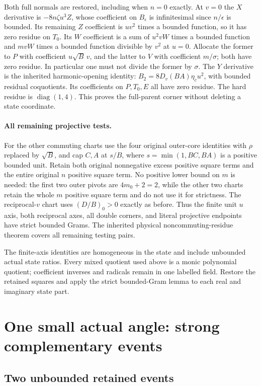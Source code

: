 Both full normals are restored, including when $n=0$ exactly.
At $v=0$ the $X$ derivative is $-8n\zeta u^3Z$, whose coefficient
on $B_\epsilon$ is infinitesimal since $n/\epsilon$ is bounded.
Its remaining $Z$ coefficient is $uv^2$ times a bounded function,
so it has zero residue on $T_0$.  Its $W$ coefficient is a sum of
$u^2vW$ times a bounded function and $mvW$ times a bounded
function divisible by $v^2$ at $u=0$.  Allocate the former to
$P$ with coefficient $u\sqrt B\,v$, and the latter to $V$ with
coefficient $m/\sigma$; both have zero residue.  In particular one
must not divide the former by $\sigma$.
The $Y$ derivative is the inherited harmonic-opening identity:
$B_2=8D_v(BA)\eta_cu^2$, with bounded residual coquotients.
Its coefficients on $P,T_0,E$ all have zero residue.  The hard
residue is $\operatorname{diag}(1,4)$.  This proves the full-parent
corner without deleting a state coordinate.

\paragraph{All remaining projective tests.}
For the other commuting charts use the four original outer-core
identities with $\rho$ replaced by $\sqrt B$, and cap $C,A$ at
$s/B$, where $s=\min(1,BC,BA)$ is a positive bounded unit.
Retain both original nonnegative excess positive square terms and the entire
original $n$ positive square term.  No positive lower bound on $m$ is needed:
the first two outer pivots are $4m_0+2=2$, while the other two
charts retain the whole $m$ positive square term and do not use it for strictness.
The reciprocal-$v$ chart uses $(D/B)_0>0$ exactly as before.
Thus the finite unit $u$ axis, both reciprocal axes, all double
corners, and literal projective endpoints have strict bounded
Grams.  The inherited physical noncommuting-residue theorem covers
all remaining testing pairs.

The finite-axis identities are homogeneous in the state and include
unbounded actual state ratios. Every mixed quotient used above is a
monic polynomial quotient; coefficient inverses and radicals remain in
one labelled field. Restore the retained squares and apply the strict
bounded-Gram lemma to each real and imaginary state part.

\section{One small actual angle: strong complementary events}
\subsection{Two unbounded retained events}
\label{component:p0c7a15f800d9}

